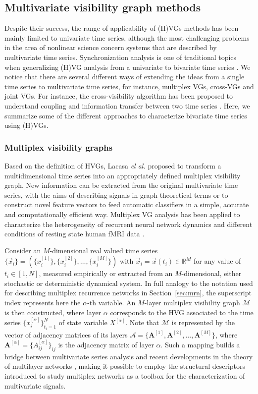 	\subsection{Multivariate visibility graph methods}
	Despite their success, the range of applicability of (H)VGs methods has been mainly limited to univariate time series, although the most challenging problems in the area of nonlinear science concern systems that are described by multivariate time series. Synchronization analysis is one of traditional topics when generalizing (H)VG analysis from a univariate to bivariate time series \cite{Ahmadlou2012a,Mitra2012}. We notice that there are several different ways of extending the ideas from a single time series to multivariate time series, for instance, multiplex VGs, cross-VGs and joint VGs. For instance, the cross-visibility algorithm has been proposed to understand coupling and information transfer between two time series \cite{Mehraban2013}. Here, we summarize some of the different approaches to characterize bivariate time series using (H)VGs. 
	
		\subsubsection{Multiplex visibility graphs} \label{sec:multiplexVG}
		Based on the definition of HVGs, Lacasa \textit{el al.} \cite{Lacasa2015b} proposed to transform a multidimensional time series into an appropriately defined multiplex visibility graph. New information can be extracted from the original multivariate time series, with the aims of describing signals in graph-theoretical terms or to construct novel feature vectors to feed automatic classifiers in a simple, accurate and computationally efficient way. Multiplex VG analysis has been applied to characterize the heterogeneity of recurrent neural network dynamics \cite{Bianchi2017} and different conditions of resting state human fMRI data \cite{Sannino2017}. 
		
		Consider an $M$-dimensional real valued time series $\{ \vec{x}_i \} = (\{ x_i^{[1]}\}, \{x_i^{[2]} \}, \dots, \{x_i^{[M]} \})$ with $\vec{x}_i = \vec{x}(t_i)  \in \mathbb{R}^M$ for any value of $t_i \in [1, N]$, measured empirically or extracted from an $M$-dimensional, either stochastic or deterministic dynamical system. In full analogy to the notation used for describing multiplex recurrence networks in Section~\ref{sec:mrn}, the superscript index represents here the $\alpha$-th variable. An $M$-layer multiplex visibility graph $\mathcal{M}$ is then constructed, where layer $\alpha$ corresponds to the HVG associated to the time series $\{ x_i^{[\alpha]}\}_{t_i=1}^{N}$ of state variable $X^{[\alpha]}$. Note that $\mathcal{M}$ is represented by the vector of adjacency matrices of its layers $\mathbf{\mathcal{A}} = \{\mathbf{A}^{[1]}, \mathbf{A}^{[2]}, \dots, \mathbf{A}^{[M]}\}$, where $\mathbf{A}^{[\alpha]} = \{A_{ij}^{[\alpha]} \}_{ij}$ is the adjacency matrix of layer $\alpha$. Such a mapping builds a bridge between multivariate series analysis and recent developments in the theory of multilayer networks \cite{Boccaletti2014}, making it possible to employ the structural descriptors introduced to study multiplex networks as a toolbox for the characterization of multivariate signals. 
		

